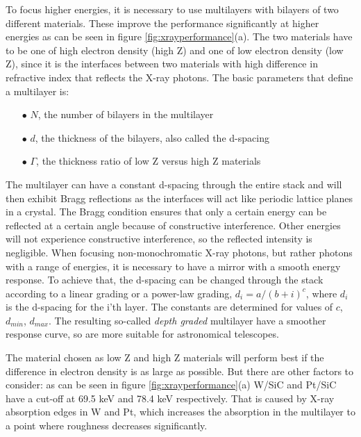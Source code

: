 To focus higher energies, it is necessary to use multilayers with bilayers of two different materials. These improve the performance significantly at higher energies as can be seen in figure \ref{fig:xrayperformance}(a). The two materials have to be one of high electron density (high Z) and one of low electron density (low Z), since it is the interfaces between two materials with high difference in refractive index that reflects the X-ray photons. The basic parameters that define a multilayer is:

\begin{itemize}
	\item[$\bullet$] $N$, the number of bilayers in the multilayer
	\item[$\bullet$] $d$, the thickness of the bilayers, also called the d-spacing
	\item[$\bullet$] $\Gamma$, the thickness ratio of low Z versus high Z materials
\end{itemize}

The multilayer can have a constant d-spacing through the entire stack and will then exhibit Bragg reflections as the interfaces will act like periodic lattice planes in a crystal. The Bragg condition ensures that only a certain energy can be reflected at a certain angle because of constructive interference. Other energies will not experience constructive interference, so the reflected intensity is negligible. When focusing non-monochromatic X-ray photons, but rather photons with a range of energies, it is necessary to have a mirror with a smooth energy response. To achieve that, the d-spacing can be changed through the stack according to a linear grading or a power-law grading\cite{Joensen:12je}, $d_i = a/(b+i)^c$, where $d_i$ is the d-spacing for the i'th layer. The constants are determined for values of $c$, $d_{min}$, $d_{max}$. The resulting so-called \emph{depth graded} multilayer have a smoother response curve, so are more suitable for astronomical telescopes.

The material chosen as low Z and high Z materials will perform best if the difference in electron density is as large as possible. But there are other factors to consider: as can be seen in figure \ref{fig:xrayperformance}(a) W/SiC and Pt/SiC have a cut-off at 69.5 keV and 78.4 keV respectively. That is caused by X-ray absorption edges in W and Pt, which increases the absorption in the multilayer to a point where roughness decreases significantly.

